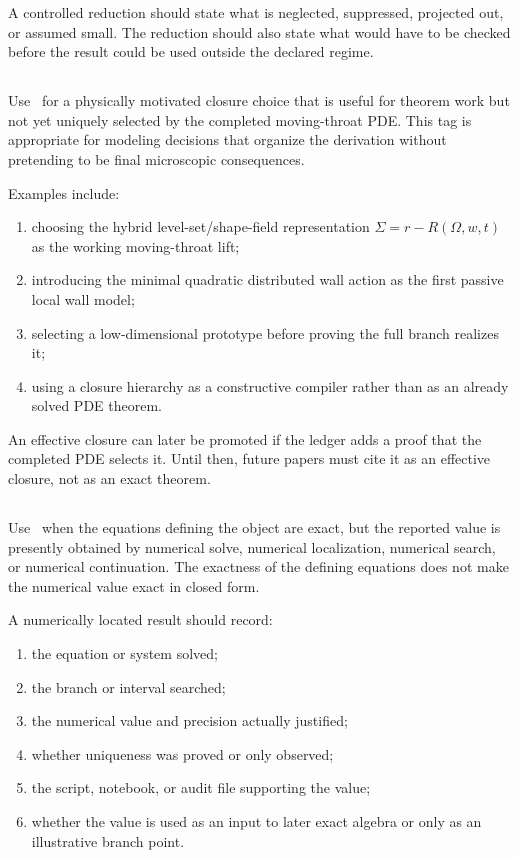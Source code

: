 A controlled reduction should state what is neglected, suppressed, projected out, or assumed small.  The reduction should also state what would have to be checked before the result could be used outside the declared regime.

\subsection{\StatusEffective}
\label{subsec:status-effective}

Use \StatusEffective\ for a physically motivated closure choice that is useful for theorem work but not yet uniquely selected by the completed moving-throat PDE.  This tag is appropriate for modeling decisions that organize the derivation without pretending to be final microscopic consequences.

Examples include:
\begin{enumerate}[leftmargin=2.2em]
  \item choosing the hybrid level-set/shape-field representation \(\Sigma=r-R(\Omega,w,t)\) as the working moving-throat lift;
  \item introducing the minimal quadratic distributed wall action as the first passive local wall model;
  \item selecting a low-dimensional prototype before proving the full branch realizes it;
  \item using a closure hierarchy as a constructive compiler rather than as an already solved PDE theorem.
\end{enumerate}

An effective closure can later be promoted if the ledger adds a proof that the completed PDE selects it.  Until then, future papers must cite it as an effective closure, not as an exact theorem.

\subsection{\StatusNumerical}
\label{subsec:status-numerical}

Use \StatusNumerical\ when the equations defining the object are exact, but the reported value is presently obtained by numerical solve, numerical localization, numerical search, or numerical continuation.  The exactness of the defining equations does not make the numerical value exact in closed form.

A numerically located result should record:
\begin{enumerate}[leftmargin=2.2em]
  \item the equation or system solved;
  \item the branch or interval searched;
  \item the numerical value and precision actually justified;
  \item whether uniqueness was proved or only observed;
  \item the script, notebook, or audit file supporting the value;
  \item whether the value is used as an input to later exact algebra or only as an illustrative branch point.
\end{enumerate}

